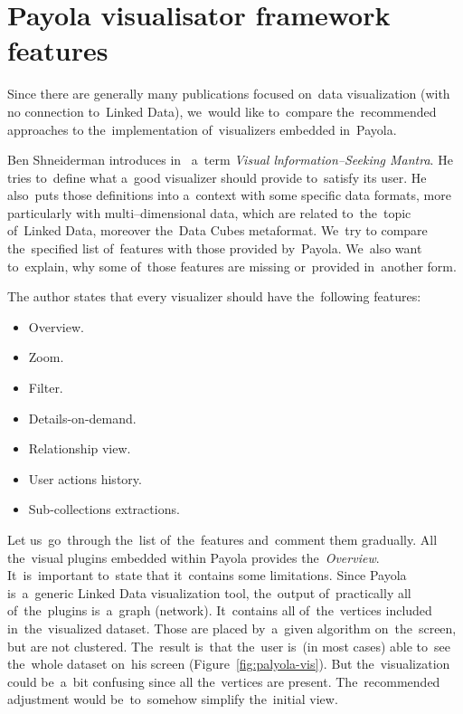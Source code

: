 \section{Payola visualisator framework features}
\label{sec:rw:mantra}
Since there are generally many publications focused on~data visualization (with no
connection to~Linked Data), we~would like to~compare the~recommended approaches to
the~implementation of~visualizers embedded in~Payola.

Ben Shneiderman introduces  in~\cite{mantra} a~term \emph{Visual lnformation--Seeking Mantra}.
He tries to~define
what a~good visualizer should provide to~satisfy its user. He also~puts those definitions into
a~context with some specific data formats, more particularly with multi--dimensional data,
which are related to~the~topic of~Linked Data, moreover the~Data Cubes metaformat. We~try to
compare the~specified list of~features with those provided by~Payola. We~also want to~explain,
why some of~those features are missing or~provided in~another form.

The author states that every visualizer should have the~following features:

\begin{itemize}
\item Overview.
\item Zoom.
\item Filter.
\item Details-on-demand.
\item Relationship view.
\item User actions history.
\item Sub-collections extractions.
\end{itemize}

Let us~go~through the~list of~the~features and~comment them gradually. All the~visual plugins
embedded within Payola provides the~\emph{Overview}. It~is~important to~state
that it~contains some limitations. Since Payola is~a~generic Linked Data visualization tool,
the~output of~practically all of~the~plugins is~a~graph (network). It~contains all of~the~vertices
included in~the~visualized dataset. Those are placed by~a~given algorithm on~the~screen,
but are not clustered. The~result is~that the~user is~(in most cases) able to~see the~whole
dataset on~his screen (Figure~\ref{fig:palyola-vis}). But the~visualization could be~a~bit confusing since all the~vertices
are present. The~recommended adjustment would be~to~somehow simplify the~initial view.

